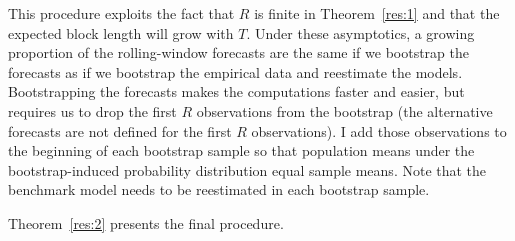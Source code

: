 \documentclass[12pt,fleqn]{article}
\theoremstyle{definition}
\begin{document}
This procedure exploits the fact that $R$ is finite in
Theorem~\ref{res:1} and that the expected block length will grow with
$T$.  Under these asymptotics, a growing proportion of the
rolling-window forecasts are the same if we bootstrap the forecasts as
if we bootstrap the empirical data and reestimate the models.
Bootstrapping the forecasts makes the computations faster and easier,
but requires us to drop the first $R$ observations from the bootstrap
(the alternative forecasts are not defined for the first $R$
observations).  I add those observations to the beginning of each
bootstrap sample so that population means under the bootstrap-induced
probability distribution equal sample means.  Note that the benchmark
model needs to be reestimated in each bootstrap sample.

Theorem~\ref{res:2} presents the final procedure.
\end{document}
